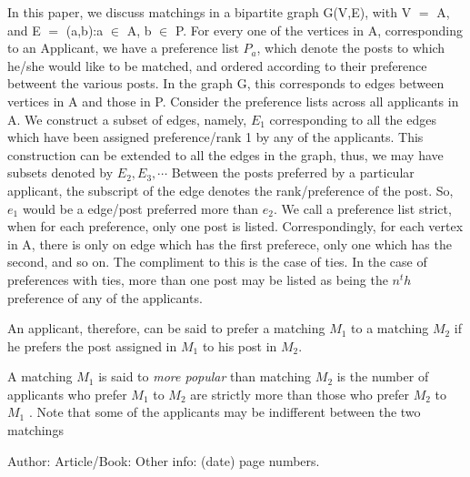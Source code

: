 \documentclass{llncs}
\begin{document}
In this paper, we discuss  matchings in a bipartite graph G(V,E), with V $=$ A\cupP, and E $=$ (a,b):\lbrace a $\in$ A, b $\in$ P\rbrace. 
For every one of the vertices in A, corresponding to an Applicant, we have a preference list $P_a$,
which denote the posts to which he/she would like to be matched, and ordered according to their preference betweent the various posts. In the graph G, this corresponds to edges between vertices in A and those in P. 
Consider the preference lists across all applicants in A. 
We construct a subset of edges, namely, $E_1$ corresponding to all the edges which have been assigned preference/rank 1 by any of the applicants. 
This construction can be extended to all the edges in the graph, thus, we may have subsets denoted by $E_2, E_3, \cdots$ 
Between the posts preferred by a particular applicant, the subscript of the edge denotes the rank/preference of the post. So, $e_1$ would be a edge/post preferred more than $e_2$.
We call a preference list strict, when for each preference, only one post is listed. Correspondingly, for each vertex in A, there is only on edge which has the first preferece, only one which has the second, and so on. The compliment to this is the case of ties. In the case of preferences with ties, more than one post may be listed as being the $n^th$ preference of any of the applicants.


An applicant, therefore, can be said to prefer a matching $M_1$ to a matching $M_2$ if he prefers the post assigned in $M_1$ to his post in  $M_2$.  

A matching $M_1$ is said to \emph{more popular} than matching $M_2$ is the number of applicants who prefer $M_1$ to $M_2$ are strictly more than those who prefer $M_2$ to $M_1$ .  
Note that some of the applicants may be indifferent between the two matchings 



























%
%

\begin{thebibliography}{1}
Author:
Article/Book:
Other info: (date) page numbers.
\end{thebibliography}
\end{document}
